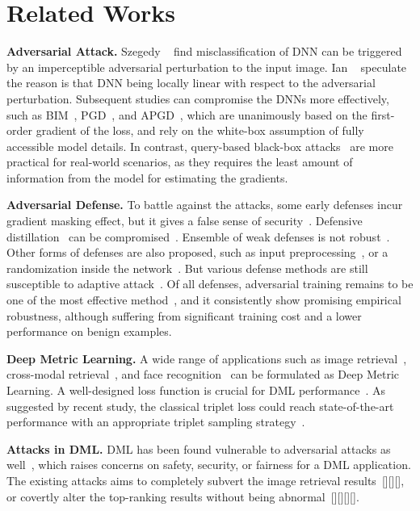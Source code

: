 \documentclass[10pt,twocolumn,letterpaper]{article}
\begin{document}
\section{Related Works}
\label{sec:2}

\textbf{Adversarial Attack.}
%
Szegedy \etal~\cite{l-bfgs} find misclassification of DNN can be triggered by
an imperceptible adversarial perturbation to the input image.
%
Ian \etal~\cite{fgsm} speculate the reason is that DNN being locally linear
with respect to the adversarial perturbation.
%
Subsequent studies can compromise the DNNs more effectively, such as
BIM~\cite{i-fgsm}, PGD~\cite{madry}, and APGD~\cite{apgd}, which are
unanimously based on the first-order gradient of the loss, and rely on the
white-box assumption of fully accessible model details.
%
In contrast, query-based black-box attacks~\cite{nes-atk,spsa-atk} are more
practical for real-world scenarios, as they requires the least amount of
information from the model for estimating the gradients.

\textbf{Adversarial Defense.}
%
To battle against the attacks, some early defenses incur gradient masking
effect, but it gives a false sense of security~\cite{obfuscated}.
%
Defensive distillation~\cite{distill2} can be compromised~\cite{cw}.
%
Ensemble of weak defenses is not robust~\cite{ensembleweak}.
%
Other forms of defenses are also proposed, such as input
preprocessing~\cite{deflecting}, or a randomization inside the
network~\cite{self-ensemble}.
%
But various defense methods are still susceptible to adaptive
attack~\cite{adaptive}.
%
Of all defenses, adversarial training remains to be one of the most
effective method~\cite{bilateral,advtrain-triplet,benchmarking}, and it
consistently show promising empirical robustness,
although suffering from significant training cost and a lower performance
on benign examples.

\textbf{Deep Metric Learning.}
%
A wide range of applications such as image retrieval~\cite{imagesim2},
cross-modal retrieval~\cite{ladderloss}, and face recognition~\cite{facenet}
can be formulated as Deep Metric Learning.
%
A well-designed loss function is crucial for DML performance~\cite{dmlreality}.
As suggested by recent study, the classical triplet loss could reach
state-of-the-art performance with an appropriate triplet sampling
strategy~\cite{revisiting}.

\textbf{Attacks in DML.}
%
DML has been found vulnerable to adversarial attacks as
well~\cite{advrank,advorder,robrank}, which raises concerns on
safety, security, or fairness for a DML application.
%
The existing attacks aims to completely subvert the image retrieval results~[][][],
or covertly alter the top-ranking results without being abnormal~[][][][].
\end{document}
